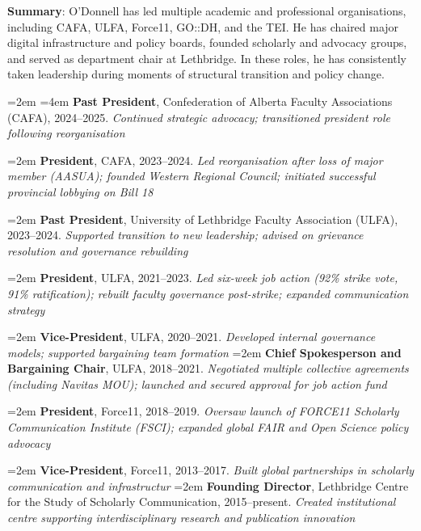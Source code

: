 \documentclass[12pt]{article}
\begin{document}
\textbf{Summary}: O'Donnell has led multiple academic and professional organisations, including CAFA, ULFA, Force11, GO::DH, and the TEI. He has chaired major digital infrastructure and policy boards, founded scholarly and advocacy groups, and served as department chair at Lethbridge. In these roles, he has consistently taken leadership during moments of structural transition and policy change.

{\leftskip=2em
\hangindent=4em
\noindent
\textbf{Past President}, Confederation of Alberta Faculty Associations (CAFA), 2024–2025. \textit{Continued strategic advocacy; transitioned president role following reorganisation}

\vspace{0.5em}
\hangindent=2em
\noindent
\textbf{President}, CAFA, 2023–2024. \textit{Led reorganisation after loss of major member (AASUA); founded Western Regional Council; initiated successful provincial lobbying on Bill 18}

\vspace{0.5em}
\hangindent=2em
\noindent
\textbf{Past President}, University of Lethbridge Faculty Association (ULFA), 2023–2024. \textit{Supported transition to new leadership; advised on grievance resolution and governance rebuilding}

\vspace{0.5em}
\hangindent=2em
\noindent
\textbf{President}, ULFA, 2021–2023. \textit{Led six-week job action (92\% strike vote, 91\% ratification); rebuilt faculty governance post-strike; expanded communication strategy}

\vspace{0.5em}
\hangindent=2em
\noindent
\textbf{Vice-President}, ULFA, 2020–2021. \textit{Developed internal governance models; supported bargaining team formation}
\vspace{0.5em}
\hangindent=2em
\noindent
\textbf{Chief Spokesperson and Bargaining Chair}, ULFA, 2018–2021. \textit{Negotiated multiple collective agreements (including Navitas MOU); launched and secured approval for job action fund}

\vspace{0.5em}
\hangindent=2em
\noindent
\textbf{President}, Force11, 2018–2019. \textit{Oversaw launch of FORCE11 Scholarly Communication Institute (FSCI); expanded global FAIR and Open Science policy advocacy}

\vspace{0.5em}
\hangindent=2em
\noindent
\textbf{Vice-President}, Force11, 2013–2017. \textit{Built global partnerships in scholarly communication and infrastructur}
\vspace{0.5em}
\hangindent=2em
\noindent
\textbf{Founding Director}, Lethbridge Centre for the Study of Scholarly Communication, 2015–present. \textit{Created institutional centre supporting interdisciplinary research and publication innovation}

}
\end{document}

